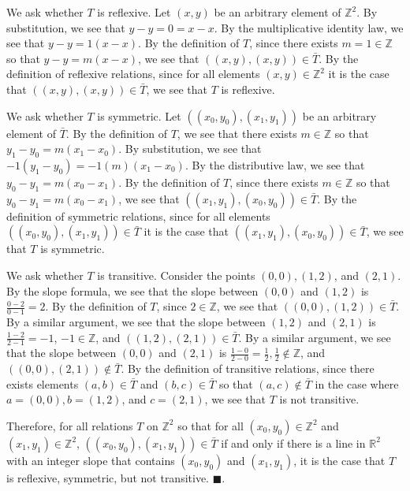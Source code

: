 \documentclass{article}
\theoremstyle{definition}
\renewcommand{\qed}{\blacksquare}
\newcommand{\R}{\mathbb{R}}
\newcommand{\Z}{\mathbb{Z}}
\begin{document}
	We ask whether $T$ is reflexive.
	Let $(x, y)$ be an arbitrary element of $\Z^2$.
	By substitution, we see that $y - y = 0 = x - x$.
	By the multiplicative identity law, we see that $y - y = 1(x - x)$.
	By the definition of $T$, since there exists $m = 1 \in \Z$ so that $y - y = m(x - x)$, we see that $((x, y), (x, y)) \in \bar T$.
	By the definition of reflexive relations, since for all elements $(x, y) \in \Z^2$ it is the case that $((x, y), (x, y)) \in \bar T$, we see that $T$ is reflexive.

	We ask whether $T$ is symmetric.
	Let $((x_0, y_0), (x_1, y_1))$ be an arbitrary element of $\bar T$.
	By the definition of $T$, we see that there exists $m \in \Z$ so that $y_1 - y_0 = m(x_1 - x_0)$.
	By substitution, we see that$-1(y_1 - y_0) = -1(m)(x_1 - x_0)$.
	By the distributive law, we see that $y_0 - y_1 = m(x_0 - x_1)$.
	By the definition of $T$, since there exists $m \in \Z$ so that $y_0 - y_1 = m(x_0 - x_1)$, we see that $((x_1, y_1), (x_0, y_0)) \in \bar T$.
	By the definition of symmetric relations, since for all elements $((x_0, y_0), (x_1, y_1)) \in \bar T$ it is the case that $((x_1, y_1), (x_0, y_0)) \in \bar T$, we see that $T$ is symmetric.

	We ask whether $T$ is transitive.
	Consider the points $(0, 0), (1, 2)$, and $(2, 1)$.
	By the slope formula, we see that the slope between $(0, 0)$ and $(1, 2)$ is $\frac{0 - 2}{0 - 1} = 2$.
	By the definition of $T$, since $2 \in \Z$, we see that $((0, 0), (1, 2)) \in \bar T$.
	By a similar argument, we see that the slope between $(1, 2)$ and $(2, 1)$ is $\frac{1 - 2}{2 - 1} = -1$, $-1 \in \Z$, and $((1, 2), (2, 1)) \in \bar T$.
	By a similar argument, we see that the slope between  $(0, 0)$ and $(2, 1)$ is $\frac{1 - 0}{2 - 0} = \frac{1}{2}, \frac{1}{2} \not \in \Z$, and $((0, 0), (2, 1)) \not \in \bar T$.
	By the definition of transitive relations, since there exists elements $(a, b) \in \bar T$ and $(b, c) \in \bar T$ so that $(a, c) \not \in \bar T$ in the case where $a = (0, 0), b = (1, 2)$, and $c = (2, 1)$, we see that $T$ is not transitive.

	Therefore, for all relations $T$ on $\Z^2$ so that for all $(x_0, y_0) \in \Z^2$ and $(x_1, y_1) \in \Z^2$, $((x_0, y_0), (x_1, y_1)) \in \bar{T}$ if and only if there is a line in $\R^2$ with an integer slope that contains $(x_0, y_0)$ and $(x_1, y_1)$, it is the case that $T$ is reflexive, symmetric, but not transitive.
	$\qed$.

	\bigskip

\end{document}
